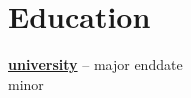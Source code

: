 \section*{Education}
\textbf{\href{ {{universitywebsite}}}{{university}}} -- {{major}} \hfill {{enddate}} \\
{{minor}}